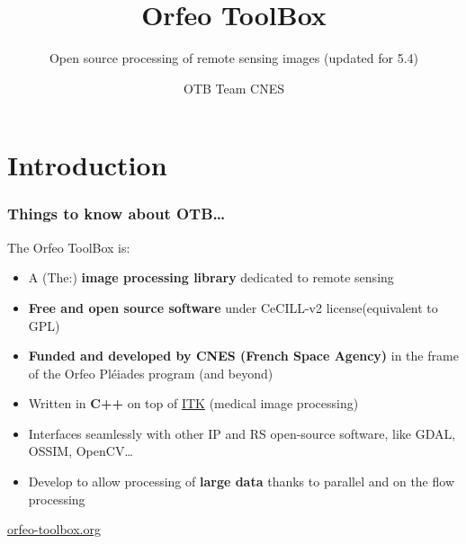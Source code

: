 \documentclass[8pt]{beamer}
\title{Orfeo ToolBox}
\subtitle{Open source processing of remote sensing images (updated for 5.4)}
\author{OTB Team CNES}
\date{}
\begin{document}
\begin{frame}
\titlepage
\end{frame}

\section*{Introduction}

\begin{frame}
\frametitle{Things to know about OTB\ldots}
\begin{block}{The Orfeo ToolBox is:}
\begin{itemize}
\item A (The:) \textbf{image processing library} dedicated to remote sensing
\item \textbf{Free and open source software} under CeCILL-v2 license(equivalent to GPL)
\item \textbf{Funded and developed by CNES (French Space Agency)} in the frame
  of the Orfeo Pléiades program (and beyond)
\item Written in \textbf{C++} on top of \href{www.itk.org}{ITK} (medical image
  processing)
\item Interfaces seamlessly with other IP and RS open-source software, like GDAL, OSSIM, OpenCV\ldots
\item Develop to allow processing of \textbf{large data} thanks to parallel and on the flow processing
\end{itemize}
\end{block}

\begin{center}
{\huge\textcolor{red}{\href{http://www.orfeo-toolbox.org}{orfeo-toolbox.org}}}
\end{center}

\end{frame}
\end{document}
